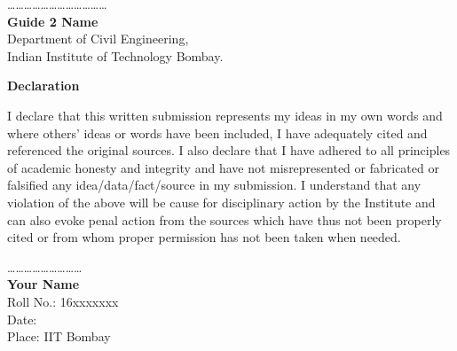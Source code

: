 \documentclass[12pt, a4paper, twoside, openright]{Thesis} %
\newcommand\myemptypage{
    \null
    \thispagestyle{empty}
    \addtocounter{page}{-1}
    \newpage
    }
\begin{document}
{{\vspace{0.6cm}

\begin{flushleft}
\ldots \ldots \ldots \ldots \ldots \ldots \ldots \ldots \ldots \ldots \ldots \ldots\\
\textbf{Guide 2 Name}\\
Department of Civil Engineering,\\
Indian Institute of Technology Bombay.
\end{flushleft}
\vfill{}}


\clearpage %

\myemptypage



{ %

\centerline{\textbf{\LARGE {Declaration}}}}
\vspace{3em}
I declare that this written submission represents my ideas in my own words and where others' ideas or words have been included, I have adequately cited and referenced the original sources. I also declare that I have adhered to all principles of academic honesty and integrity and have not misrepresented or fabricated or falsified any idea/data/fact/source in my submission. I understand that any violation of the above will be cause for disciplinary action by the Institute and can also evoke penal action from the sources which have thus not been properly cited or from whom proper permission has not been taken when needed.

\bigskip
\bigskip
\bigskip
\bigskip

\begin{flushleft}
\ldots \ldots \ldots \ldots \ldots \ldots \ldots \ldots \ldots\\
\vspace{2mm}
\textbf{Your Name} \\
Roll No.: 16xxxxxxx \\
Date:  \\
Place: IIT Bombay
\end{flushleft}

\clearpage %
\myemptypage





}
\end{document}
